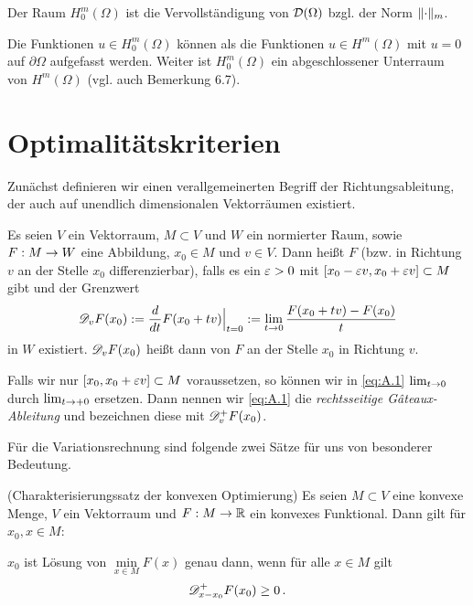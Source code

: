 \begin{defi}\label{def:A.7}
Der Raum $H^m_0(\Omega)$ ist die Vervollständigung von $\mathcal D(\Omega)$ bzgl. der Norm $\lVert \cdot\rVert_m$.
\end{defi}

\begin{bem}\label{bem:A.8}
Die Funktionen $u \in H^m_0(\Omega)$ können als die Funktionen $u \in H^m(\Omega)$ mit $u = 0$ auf $\partial \Omega$ aufgefasst werden. Weiter ist $H^m_0(\Omega)$ ein abgeschlossener Unterraum von $H^m(\Omega)$ (vgl. auch \cite{Walker} Bemerkung 6.7).
\end{bem}



\section{Optimalitätskriterien}
\label{anhang:A.2}

Zunächst definieren wir einen verallgemeinerten Begriff der Richtungsableitung, der auch auf unendlich dimensionalen Vektorräumen existiert.

\begin{defi}\label{def:Gateaux-Ableitung}
Es seien $V$ ein Vektorraum, $M\subset V$ und $W$ ein normierter Raum, sowie $F: M \rightarrow W$ eine Abbildung, $x_0 \in M$ und $v \in V$. Dann heißt $F$ \textit{} (bzw. in Richtung $v$ an der Stelle $x_0$ differenzierbar), falls es ein $\varepsilon >0$ mit $[x_0-\varepsilon v, x_0 + \varepsilon v] \subset M$ gibt und der Grenzwert
\begin{align}\label{eq:A.1}
	\mathscr D_v F (x_0) :=\frac d{d t} F(x_0+tv)\Big|_{t=0} := \lim_{t\rightarrow 0} \frac{F(x_0+tv)-F(x_0)}t
\end{align}
in $W$ existiert. $\mathscr D_vF(x_0)$ heißt dann \textit{} von $F$ an der Stelle $x_0$ in Richtung $v$.

Falls wir nur $[x_0,x_0 + \varepsilon v] \subset M$ voraussetzen, so können wir in \eqref{eq:A.1} $\lim_{t\rightarrow 0}$ durch $\lim_{t \rightarrow + 0}$ ersetzen. Dann nennen wir \eqref{eq:A.1} die \textit{rechtsseitige Gâteaux-Ableitung} und bezeichnen diese mit $\mathscr D^+_v F(x_0)$.
\end{defi}

Für die Variationsrechnung sind folgende zwei Sätze für uns von besonderer Bedeutung.

\begin{satz}\label{satz:A.10}
\textnormal{(Charakterisierungssatz der konvexen Optimierung)} Es seien $M \subset V$ eine konvexe Menge, $V$ ein Vektorraum und $F : M \rightarrow \mathbb{R}$ ein konvexes Funktional. Dann gilt für $x_0, x \in M$:

$x_0$ ist Lösung von $\min\limits_{x \in M} F(x)$ genau dann, wenn für alle $x \in M$ gilt
\[
	\mathscr D^+_{x-x_0} F(x_0) \ge 0 \, .
\]
\end{satz}

